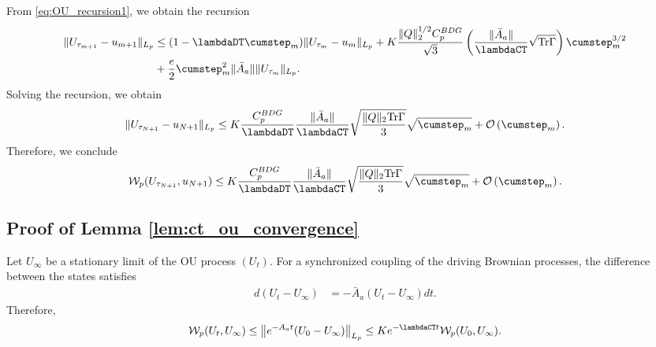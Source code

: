 \documentclass[11pt]{article}
\begin{document}
From \eqref{eq:OU_recursion1}, we obtain the recursion
\begin{equation}
\begin{split}
    \lVert U_{\tau_{m+1}} - u_{m+1} \rVert_{L_p}
    &\leq (1 - \lambdaDT \cumstep_m) \lVert U_{\tau_m} - u_m \rVert_{L_p}
    + 
    K \frac{\lVert Q \rVert_2^{1/2}C_p^{BDG}}{\sqrt{3}}
    \left(\frac{\lVert \bar{A}_a \rVert }{\lambdaCT} \sqrt{\mathrm{Tr} \Gamma} \right)
    \cumstep_m^{3/2} 
    \\ &
    + \frac{e}{2} \cumstep_m^2\lVert \bar{A}_a \rVert \lVert U_{\tau_m} \rVert_{L_p}
    .
\end{split}
\end{equation}
Solving the recursion, we obtain 
\begin{align*}
    \lVert U_{\tau_{N+1}} - u_{N+1} \rVert_{L_p}
    \leq 
    K \frac{C_p^{BDG}}{\lambdaDT} 
    \frac{\lVert \bar{A}_a \rVert }{\lambdaCT} \sqrt{\frac{\lVert Q \rVert_2\mathrm{Tr} \Gamma}{3}} \sqrt{\cumstep_m}
    + \mathcal{O}\left(\cumstep_m \right) 
    .
\end{align*}
Therefore, we conclude
\begin{equation}
    \mathcal{W}_p (U_{\tau_{N+1}}, u_{N+1})
    \leq
    K \frac{C_p^{BDG}}{\lambdaDT} 
    \frac{\lVert \bar{A}_a \rVert }{\lambdaCT} \sqrt{\frac{\lVert Q \rVert_2\mathrm{Tr} \Gamma}{3}} \sqrt{\cumstep_m}
    + \mathcal{O}\left(\cumstep_m \right) 
    .
\end{equation}




\subsection{Proof of Lemma \ref{lem:ct_ou_convergence}}\label{app:ct_ou_convergence}
Let $U_\infty$ be a stationary limit of the OU process $(U_t)$. 
For a synchronized coupling of the driving Brownian processes, the difference between the states satisfies
\begin{align*}
    d (U_t - U_\infty) &= - \bar{A}_a (U_t - U_\infty)  dt . 
\end{align*}
Therefore, 
\begin{align*}
    \mathcal{W}_p (U_t, U_\infty) \leq  \left\lVert e^{-A_a t} (U_0 - U_\infty) \right\rVert_{L_p}
    \leq K e^{-\lambdaCT t} \mathcal{W}_p (U_0, U_\infty) .
\end{align*}











 
     
\end{document}
